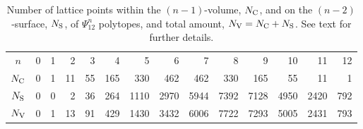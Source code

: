 \documentclass[12pt,a4paper]{article}
\begin{document}
\begin{table}
\caption{Number of lattice points within the $(n-1)$-volume, $N_{\rm C}$, and
on the $(n-2)$-surface, $N_{\rm S}$, of $\Psi_{12}^n$ polytopes, and total
amount, $N_{\rm V}=N_{\rm C}+N_{\rm S}$.   See text for further details.}
\label{t:poli}
\begin{center}
\begin{tabular}{|c|r|r|r|r|r|r|r|r|r|r|r|r|r|} \hline
\hline
$n$                 & \phantom{$$}0          & 1 &  2                  &  3                  &   4                  &    5 &    6 &    7 &    8                  &    9                 &   10                &   11 &  12                     \\
$N_{\rm C}$         & \phantom{$$}0          & 1 & 11                  & 55                  & 165                  &  330 &  462 &  462 &  330                  &  165                 &   55                &   11 &   1                     \\
$N_{\rm S}$         & \phantom{$$}0          & 0 &  2                  & 36                  & 264                  & 1110 & 2970 & 5944 & 7392                  & 7128                 & 4950                & 2420 & 792                     \\
$N_{\rm V}$         & \phantom{$$}0          & 1 & 13                  & 91                  & 429                  & 1430 & 3432 & 6006 & 7722                  & 7293                 & 5005                & 2431 & 793                     \\
\hline                            
\end{tabular}                     
\end{center}                      
\end{table}                       
%                                 
\end{document}
